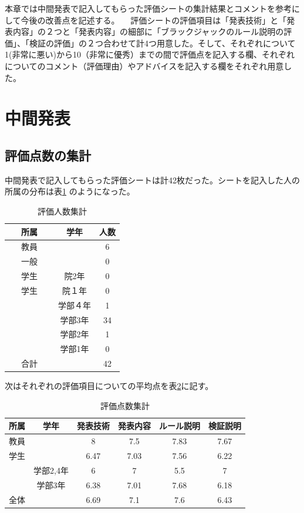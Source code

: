  本章では中間発表で記入してもらった評価シートの集計結果とコメントを参考にして今後の改善点を記述する。
　評価シートの評価項目は「発表技術」と「発表内容」の２つと「発表内容」の細部に「ブラックジャックのルール説明の評価」、「検証の評価」の２つ合わせて計4つ用意した。そして、それぞれについて1(非常に悪い)から10（非常に優秀）までの間で評価点を記入する欄、それぞれについてのコメント（評価理由）やアドバイスを記入する欄をそれぞれ用意した。
\section{中間発表}
\subsection{評価点数の集計}
中間発表で記入してもらった評価シートは計42枚だった。シートを記入した人の所属の分布は表\ref{tab:dist} のようになった。

\begin{table}[htb]
  \begin{center}
    \caption{評価人数集計}
    \begin{tabular}{|c|c|c|} \hline 
      所属 & 学年 & 人数  \\ \hline \hline
      教員 &  & 6  \\
      一般 &  & 0 \\
      学生 & 院2年 & 0 \\
     学生 & 院１年 & 0 \\
             & 学部４年 & 1 \\
 　　　　　 & 学部3年 & 34 \\
             & 学部2年 & 1 \\
             & 学部1年 & 0 \\ \hline \hline
      合計 &  & 42 \\ \hline
    \end{tabular}
    \label{tab:dist}
  \end{center}
\end{table}
次はそれぞれの評価項目についての平均点を表\ref{tab:point}に記す。
\begin{table}[H]
\begin{center}
\caption{評価点数集計}
\begin{tabular}{|c|c|c|c|c|c|} \hline
  所属 & 学年 & 発表技術 & 発表内容 & ルール説明 & 検証説明  \\ \hline \hline
  教員 &        & 8 & 7.5 & 7.83 & 7.67 \\
  学生 &        & 6.47 & 7.03 & 7.56 & 6.22 \\
         & 学部2,4年 & 6 & 7 & 5.5 & 7 \\
         & 学部3年 & 6.38 & 7.01 & 7.68 & 6.18 \\ \hline \hline
  全体 &        & 6.69 & 7.1 & 7.6 & 6.43 \\ \hline
\end{tabular}
\label{tab:point}
\end{center}
\end{table}

